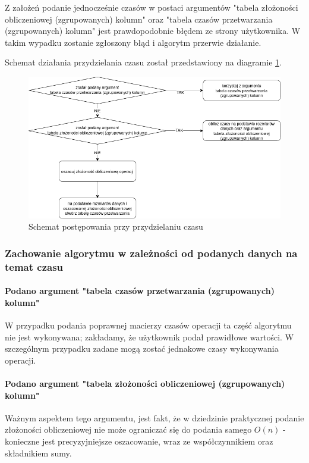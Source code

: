 \documentclass[brudnopis]{xmgr}
\begin{document}
Z założeń podanie jednocześnie czasów w postaci argumentów "tabela złożoności obliczeniowej (zgrupowanych) kolumn" oraz "tabela czasów przetwarzania (zgrupowanych) kolumn" jest prawdopodobnie błędem ze strony użytkownika. W takim wypadku zostanie zgłoszony błąd i algorytm przerwie działanie.

Schemat działania przydzielania czasu został przedstawiony na diagramie \ref{diag:time-assign}.

\begin{figure}[!tbh]
\centering
\includegraphics[width=.8\hsize]{fig/przydzielanie_czasow.png}
\caption{Schemat postępowania przy przydzielaniu czasu\label{diag:time-assign}}
\end{figure}

\subsubsection{Zachowanie algorytmu w zależności od podanych danych na temat czasu}

\paragraph{Podano argument "tabela czasów przetwarzania (zgrupowanych) kolumn"}

W przypadku podania poprawnej macierzy czasów operacji ta część algorytmu nie jest wykonywana; zakładamy, że użytkownik podał prawidłowe wartości.
W szczególnym przypadku zadane mogą zostać jednakowe czasy wykonywania operacji.

\paragraph{Podano argument "tabela złożoności obliczeniowej (zgrupowanych) kolumn"}

Ważnym aspektem tego argumentu, jest fakt, że w dziedzinie praktycznej podanie złożoności obliczeniowej nie może ograniczać się do podania samego $O(n)$ - konieczne jest precyzyjniejsze oszacowanie, wraz ze współczynnikiem oraz składnikiem sumy.
\end{document}
